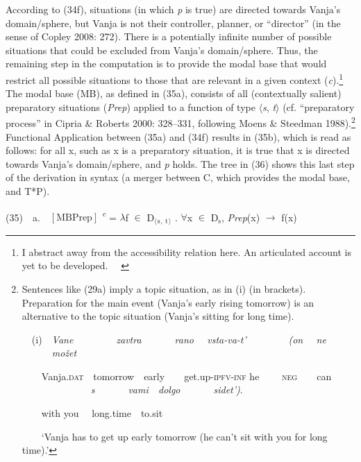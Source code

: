 \documentclass[12pt]{article}
\newcommand\textsubscript[1]{\ensuremath{{}_{\text{#1}}}}
\newenvironment{styleStandard}{\setlength\leftskip{0cm}\setlength\rightskip{0cm plus 1fil}\setlength\parindent{0cm}\setlength\parfillskip{0pt plus 1fil}\setlength\parskip{0in plus 1pt}\writerlistparindent\writerlistleftskip\leavevmode\normalfont\normalsize\writerlistlabel\ignorespaces}{\unskip\vspace{0.111in plus 0.0111in}\par}
\newcommand\writerlistleftskip{}
\newcommand\writerlistparindent{}
\newcommand\writerlistlabel{}
\providecommand\llbracket{[}
\providecommand\rrbracket{]}
\begin{document}
\begin{styleStandard}
According to (34f), situations (in which \textit{p }is true) are directed towards Vanja’s domain/sphere, but Vanja is not their controller, planner, or “director” (in the sense of Copley 2008: 272). There is a potentially infinite number of possible situations that could be excluded from Vanja’s domain/sphere. Thus, the remaining step in the computation is to provide the modal base that would restrict all possible situations to those that are relevant in a given context (\textit{c}).\footnote{ I abstract away from the accessibility relation here. An articulated account is yet to be developed. \ \ } The modal base (MB), as defined in (35a), consists of all (contextually salient) preparatory situations (\textit{Prep}) applied to a function of type ${\langle}$\textit{s}, \textit{t}${\rangle}$ (cf. “preparatory process” in Cipria \& Roberts 2000: 328–331, following Moens \& Steedman 1988).\footnote{ Sentences like (29a) imply a topic situation, as in (i) (in brackets). Preparation for the main event (Vanja’s early rising tomorrow) is an alternative to the topic situation (Vanja’s sitting for long time). \ \par \ \ (i)\ \ \textit{Vane}\textbf{\textit{ }}\textit{\ \ \ \ \ \ \ \ zavtra \ \ \ \ \ \ rano \ \ vsta-va-t’} \ \ \ \ \ \ \ \ \textit{(on \ \ ne \ \ \ \ \ \ možet \ \ \ \ }\par \ \ \ \ Vanja.\textsc{dat}\ \ tomorrow\ \ early\ \ \ \ get.up-\textsc{ipfv-inf }he \ \ \ \ \textsc{neg}\ \ \ \ can \ \ \ \ \ \ \ \ \textit{\ \ \ \ \ \ s \ \ \ \ \ \ vami\ \ dolgo \ \ \ \ \ \ sidet’)}.\par \ \ \ \ with you \ \ long.time\ \ to.sit\par \ \ \ \ ‘Vanja has to get up early tomorrow (he can’t sit with you for long time).’} Functional Application between (35a) and (34f) results in (35b), which is read as follows: for all x, such as x is a preparatory situation, it is true that x is directed towards Vanja’s domain/sphere, and \textit{p }holds. The tree in (36) shows this last step of the derivation in syntax (a merger between C, which provides the modal base, and T*P). \ 
\end{styleStandard}

\begin{styleStandard}
(35)\ \ a.\ \  $\left\llbracket \text{MB}\text{Prep}\right\rrbracket $ \textit{\textsuperscript{c}} = ${\lambda}$f ${\in}$ D\textsubscript{${\langle}$}\textit{\textsubscript{s}}\textsubscript{, }\textit{\textsubscript{t}}\textsubscript{${\rangle}$} . ${\forall}$x ${\in}$ D\textit{\textsubscript{s}}, \textit{Prep}(x) ${\rightarrow}$ f(x) 
\end{styleStandard}
\end{document}
